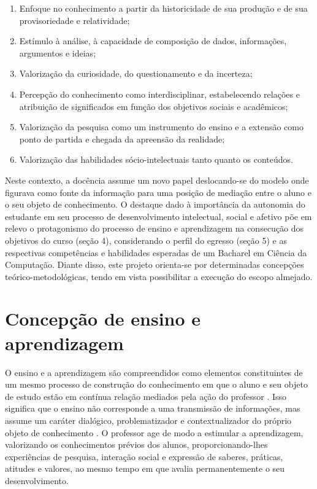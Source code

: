 \documentclass[
	12pt,				%
	openright,			%
  oneside,     %
	a4paper,			%
	chapter=TITLE,		%
	english,			%
	french,				%
	spanish,			%
	brazil				%
	]{abntex2}
\begin{document}
\begin{enumerate}[label=(\alph*)]
    \item Enfoque no conhecimento a partir da historicidade de sua produção e de sua provisoriedade e relatividade;
    \item Estímulo à análise, à capacidade de composição de dados, informações, argumentos e ideias;
    \item Valorização da curiosidade, do questionamento e da incerteza;
    \item Percepção do conhecimento como interdisciplinar, estabelecendo relações e atribuição de significados em função dos objetivos sociais e acadêmicos;
    \item Valorização da pesquisa como um instrumento do ensino e a extensão como ponto de partida e chegada da apreensão da realidade;
    \item Valorização das habilidades sócio-intelectuais tanto quanto os conteúdos.
\end{enumerate}

Neste contexto, a docência assume um novo papel deslocando-se do modelo onde figurava como fonte da informação para uma posição de mediação entre o aluno e o seu objeto de conhecimento. O destaque dado à importância da autonomia do estudante em seu processo de desenvolvimento intelectual, social e afetivo põe em relevo o protagonismo do processo de ensino e aprendizagem na consecução dos objetivos do curso (seção 4), considerando o perfil do egresso (seção 5) e as respectivas competências e habilidades esperadas de um Bacharel em Ciência da Computação. Diante disso, este projeto orienta-se por determinadas concepções teórico-metodológicas, tendo em vista possibilitar a execução do escopo almejado.

\section{Concepção de ensino e aprendizagem}

O ensino e a aprendizagem são compreendidos como elementos constituintes de um mesmo processo de construção do conhecimento em que o aluno e seu objeto de estudo estão em contínua relação mediados pela ação do professor \cite{anastasiou2004estrategias}. Isso significa que o ensino não corresponde a uma transmissão de informações, mas assume um caráter dialógico, problematizador e contextualizador do próprio objeto de conhecimento \cite{freire2005pedagogia}. O professor age de modo a estimular a aprendizagem, valorizando os conhecimentos prévios dos alunos, proporcionando-lhes experiências de pesquisa, interação social e expressão de saberes, práticas, atitudes e valores, ao mesmo tempo em que avalia permanentemente o seu desenvolvimento.
\end{document}
